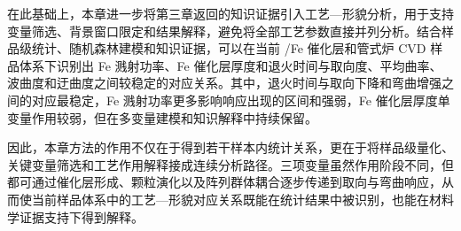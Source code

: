 在此基础上，本章进一步将第三章返回的知识证据引入工艺—形貌分析，用于支持变量筛选、背景窗口限定和结果解释，避免将全部工艺参数直接并列分析。结合样品级统计、随机森林建模和知识证据，可以在当前 /Fe 催化层和管式炉 CVD 样品体系下识别出 Fe 溅射功率、Fe 催化层厚度和退火时间与取向度、平均曲率、波曲度和迂曲度之间较稳定的对应关系。其中，退火时间与取向下降和弯曲增强之间的对应最稳定，Fe 溅射功率更多影响响应出现的区间和强弱，Fe 催化层厚度单变量作用较弱，但在多变量建模和知识解释中持续保留。

因此，本章方法的作用不仅在于得到若干样本内统计关系，更在于将样品级量化、关键变量筛选和工艺作用解释接成连续分析路径。三项变量虽然作用阶段不同，但都可通过催化层形成、颗粒演化以及阵列群体耦合逐步传递到取向与弯曲响应，从而使当前样品体系中的工艺—形貌对应关系既能在统计结果中被识别，也能在材料学证据支持下得到解释。

